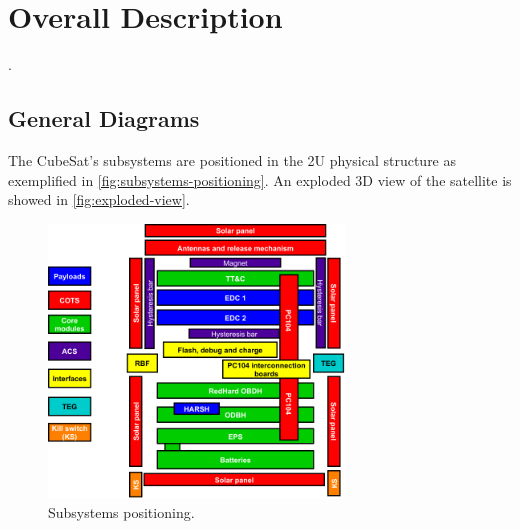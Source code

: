 %
%
%
%
%

%
%
%
%
%
%

\chapter{Overall Description} \label{ch:overall}

.

\section{General Diagrams}

The CubeSat's subsystems are positioned in the 2U physical structure as exemplified in \autoref{fig:subsystems-positioning}. An exploded 3D view of the satellite is showed in \autoref{fig:exploded-view}.

\begin{figure}[!ht]
    \begin{center}
        \includegraphics[width=0.7\textwidth]{figures/subsystems-positioning.pdf}
        \caption{Subsystems positioning.}
        \label{fig:subsystems-positioning}
    \end{center}
\end{figure}



